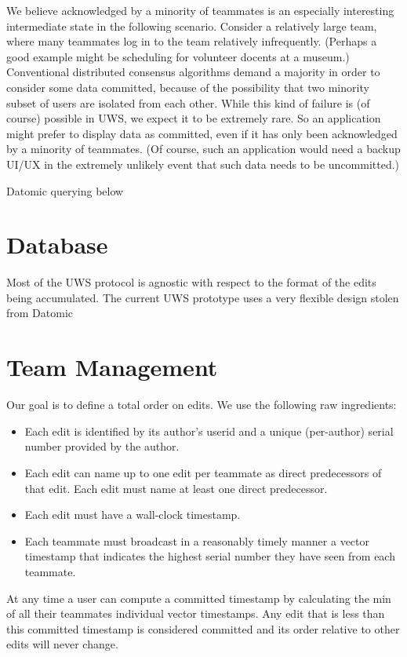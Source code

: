 \documentclass{article}
\begin{document}
We believe acknowledged by a minority of teammates is an especially interesting intermediate state in the following scenario.
Consider a relatively large team, where many teammates log in to the team relatively infrequently.
(Perhaps a good example might be scheduling for volunteer docents at a museum.)
Conventional distributed consensus algorithms demand a majority in order to consider some data committed, because of the possibility that two minority subset of users are isolated from each other.
While this kind of failure is (of course) possible in UWS, we expect it to be extremely rare.
So an application might prefer to display data as committed, even if it has only been acknowledged by a minority of teammates.
(Of course, such an application would need a backup UI/UX in the extremely unlikely event that such data needs to be uncommitted.)

Datomic querying below

\section{Database}

Most of the UWS protocol is agnostic with respect to the format of the edits being accumulated.
The current UWS prototype uses a very flexible design stolen from Datomic

\section{Team Management}

Our goal is to define a total order on edits.
We use the following raw ingredients:

\begin{itemize}
\item Each edit is identified by its author's userid and a unique (per-author) serial number provided by the author.
\item Each edit can name up to one edit per teammate as direct predecessors of that edit.
  Each edit must name at least one direct predecessor.
\item Each edit must have a wall-clock timestamp.
\item Each teammate must broadcast in a reasonably timely manner a vector timestamp that indicates the highest serial number they have seen from each teammate.
\end{itemize}

At any time a user can compute a committed timestamp by calculating the min of all their teammates individual vector timestamps.
Any edit that is less than this committed timestamp is considered committed and its order relative to other edits will never change.
\end{document}
